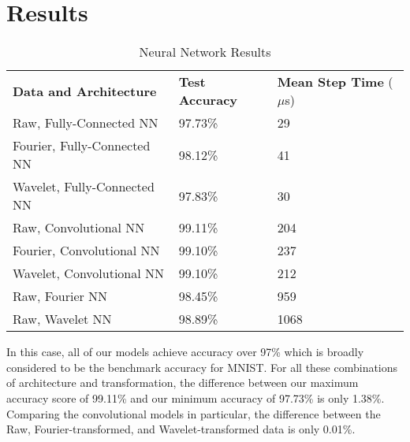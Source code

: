 \section{Results}

\begin{table}[h]
\caption{Neural Network Results}
\centering
\label{Tab:test}	
\begin{tabular}{l|ll}
\textbf{Data and Architecture}  & \textbf{Test Accuracy} & \textbf{Mean Step Time} ($\mu$s) \\\cline{1-3}
Raw, Fully-Connected NN            & 97.73\%         & 29\\
Fourier, Fully-Connected NN        & 98.12\%         & 41\\
Wavelet, Fully-Connected NN        & 97.83\%         & 30\\
\hline
Raw, Convolutional NN              & 99.11\%         & 204\\ 
Fourier, Convolutional NN          & 99.10\%         & 237\\
Wavelet, Convolutional NN          & 99.10\%         & 212\\
\hline
Raw, Fourier NN                    & 98.45\%         & 959\\
Raw, Wavelet NN                    & 98.89\%         & 1068\\ 
\end{tabular}
\end{table}

In this case, all of our models achieve accuracy over 97\% which is broadly considered to be the benchmark accuracy for MNIST. 
For all these combinations of architecture and transformation, the difference between our maximum accuracy score of 99.11\% and our minimum accuracy of 97.73\% is only 1.38\%.
Comparing the convolutional models in particular, the difference between the Raw, Fourier-transformed, and Wavelet-transformed data is only 0.01\%. 